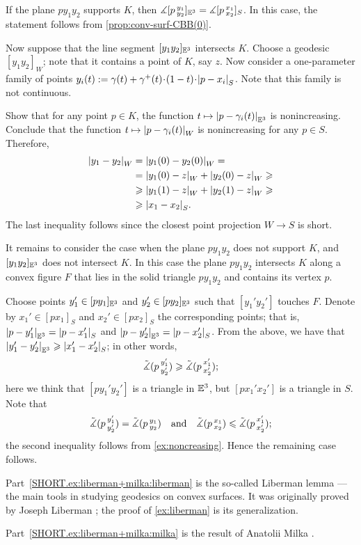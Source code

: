 If the plane $py_1y_2$ supports $K$, then 
$\measuredangle[p\,{}^{y_1}_{y_2}]_{\mathbb{E}^3}=\measuredangle[p\,{}^{x_1}_{x_2}]_S$.
In this case, the statement follows from \ref{prop:conv-surf-CBB(0)}.

Now suppose that the line segment $[y_1y_2]_{\mathbb{E}^3}$ intersects $K$.
Choose a geodesic $[y_1y_2]_W$;
note that it contains a point of $K$, say $z$.
Now consider a one-parameter family of points 
$y_i(t)\df \gamma(t)+\gamma^+(t)\z\cdot (1-t)\z\cdot \dist{p}{x_i}{S}$.
Note that this family is not continuous.

Show that for any point $p\in K$, the function $t\mapsto |{p}-{\gamma_i(t)}|_{\mathbb{E}^3}^{{}}$ is nonincreasing.
Conclude that the function $t\mapsto |{p}-{\gamma_i(t)}|_{W}^{{}}$ is nonincreasing for any $p\in S$.
Therefore, 
\begin{align*}
|{y_1}-{y_2}|_{W}^{{}}
&=|{y_1(0)}-{y_2(0)}|_{W}^{{}}=
\\
&=|{y_1(0)}-{z}|_{W}^{{}}+|{y_2(0)}-{z}|_{W}^{{}}\geqslant
\\
&\geqslant|{y_1(1)}-{z}|_{W}^{{}}+|{y_2(1)}-{z}|_{W}^{{}}\geqslant 
\\
&\geqslant|{x_1}-{x_2}|_{S}^{{}}.
\end{align*}
The last inequality follows since the closest point projection $W\to S$ is short.

It remains to consider the case when the plane $py_1y_2$ does not support $K$,
and $[y_1y_2]_{\mathbb{E}^3}$ does not intersect $K$.
In this case the plane $py_1y_2$ intersects $K$ along a convex figure $F$ that lies in the solid triangle 
$py_1y_2$ and contains its vertex $p$.

Choose points $y_1'\in [py_1]_{\mathbb{E}^3}$ and $y_2'\in [py_2]_{\mathbb{E}^3}$ such that $[y_1'y_2']$ touches $F$.
Denote by $x_1'\in [px_1]_{S}$ and $x_2'\in [px_2]_{S}$ the corresponding points;
that is, $|{p}-{y_1'}|_{\mathbb{E}^3}^{{}}=|{p}-{x_1'}|_{S}^{{}}$ and $|{p}-{y_2'}|_{\mathbb{E}^3}^{{}}=|{p}-{x_2'}|_{S}^{{}}$.
From the above, we have that $|{y_1'}-{y_2'}|_{\mathbb{E}^3}^{{}}\geqslant|{x_1'}-{x_2'}|_{S}^{{}}$;
in other words, 
\[\tilde\measuredangle(p\,{}^{y_1'}_{y_2'})\geqslant \tilde\measuredangle(p\,{}^{x_1'}_{x_2'});\]
here we think that $[p{y_1'}{y_2'}]$ is a triangle in $\mathbb{E}^3$, but $[p{x_1'}{x_2'}]$ is a triangle in $S$.
Note that 
\[\tilde\measuredangle(p\,{}^{y_1'}_{y_2'})=\tilde\measuredangle(p\,{}^{y_1}_{y_2})
\quad\text{and}\quad
\tilde\measuredangle(p\,{}^{x_1}_{x_2})\leqslant \tilde\measuredangle(p\,{}^{x_1'}_{x_2'});
\]
the second inequality follows from \ref{ex:noncreasing}.
Hence the remaining case follows.

Part~\ref{SHORT.ex:liberman+milka:liberman} is the so-called Liberman lemma --- the main tools in studying geodesics on convex surfaces.
It was originally proved by Joseph Liberman \cite{liberman}; the proof of \ref{ex:liberman} is its generalization. 

Part~\ref{SHORT.ex:liberman+milka:milka} is the result of Anatolii Milka \cite[Theorem 2]{milka1982}.

